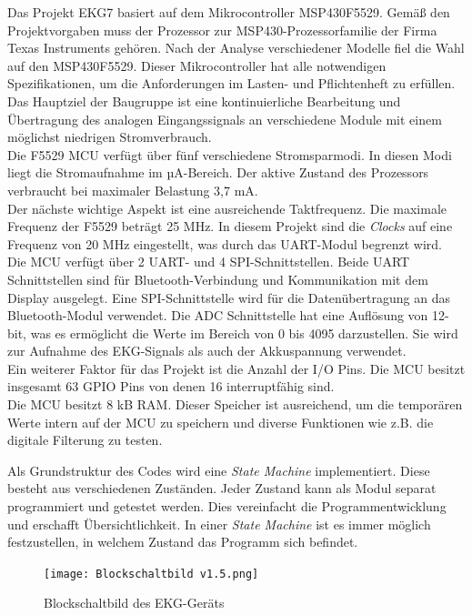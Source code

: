 Das Projekt EKG7 basiert auf dem Mikrocontroller MSP430F5529. \cite{MSP430F5529} Gemäß den Projektvorgaben muss der Prozessor zur MSP430-Prozessorfamilie der Firma Texas Instruments gehören. Nach der Analyse verschiedener Modelle fiel die Wahl auf den MSP430F5529. Dieser Mikrocontroller hat alle notwendigen Spezifikationen, um die Anforderungen im Lasten- und Pflichtenheft zu erfüllen.\\
Das Hauptziel der Baugruppe ist eine kontinuierliche Bearbeitung und Übertragung des analogen Eingangssignals an verschiedene Module mit einem möglichst niedrigen Stromverbrauch.\\
Die F5529 MCU verfügt über fünf verschiedene Stromsparmodi. In diesen Modi liegt die Stromaufnahme im µA-Bereich. Der aktive Zustand des Prozessors verbraucht bei maximaler Belastung 3,7 mA. \cite{Datenblatt_MSP430F5529}\\
Der nächste wichtige Aspekt ist eine ausreichende Taktfrequenz. Die maximale Frequenz der F5529 beträgt 25 MHz. In diesem Projekt sind die \textit{Clocks} auf eine Frequenz von 20 MHz eingestellt, was durch das UART-Modul begrenzt wird.\\
Die MCU verfügt über 2 UART- und 4 SPI-Schnittstellen. Beide UART Schnittstellen sind für Bluetooth-Verbindung und Kommunikation mit dem Display ausgelegt. Eine SPI-Schnittstelle wird für die Datenübertragung an das Bluetooth-Modul verwendet.
Die ADC Schnittstelle hat eine Auflösung von 12-bit, was es ermöglicht die Werte im Bereich von 0 bis 4095 darzustellen. Sie wird zur Aufnahme des EKG-Signals als auch der Akkuspannung verwendet.\\ 
Ein weiterer Faktor für das Projekt ist die Anzahl der I/O Pins. Die MCU besitzt insgesamt 63 GPIO Pins von denen 16 interruptfähig sind.\\
Die MCU besitzt 8 kB RAM. Dieser Speicher ist ausreichend, um die temporären Werte intern auf der MCU zu speichern und diverse Funktionen wie z.B. die digitale Filterung zu testen.

Als Grundstruktur des Codes wird eine \textit{State Machine} implementiert. Diese besteht aus verschiedenen Zuständen. Jeder Zustand kann als Modul separat programmiert und getestet werden. Dies vereinfacht die Programmentwicklung und erschafft Übersichtlichkeit. In einer \textit{State Machine} ist es immer möglich festzustellen, in welchem Zustand das Programm sich befindet.

\begin{figure} [h]
	\texttt{[image: Blockschaltbild v1.5.png]}
	\caption{Blockschaltbild des EKG-Geräts}
	\label{fig_Blockschaltbild} 
\end{figure}

